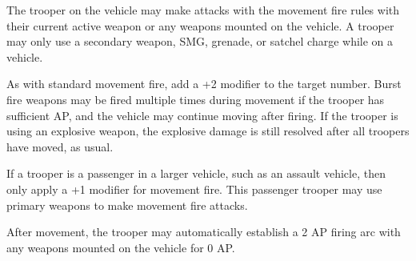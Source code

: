 The trooper on the vehicle may make attacks with the movement fire rules with their current active weapon or any weapons mounted on the vehicle.
A trooper may only use a secondary weapon, SMG, grenade, or satchel charge while on a vehicle.

As with standard movement fire, add a +2 modifier to the target number.
Burst fire weapons may be fired multiple times during movement if the trooper has sufficient AP, and the vehicle may continue moving after firing.
If the trooper is using an explosive weapon, the explosive damage is still resolved after all troopers have moved, as usual.

If a trooper is a passenger in a larger vehicle, such as an assault vehicle, then only apply a +1 modifier for movement fire.
This passenger trooper may use primary weapons to make movement fire attacks.

After movement, the trooper may automatically establish a 2 AP firing arc with any weapons mounted on the vehicle for 0 AP.
